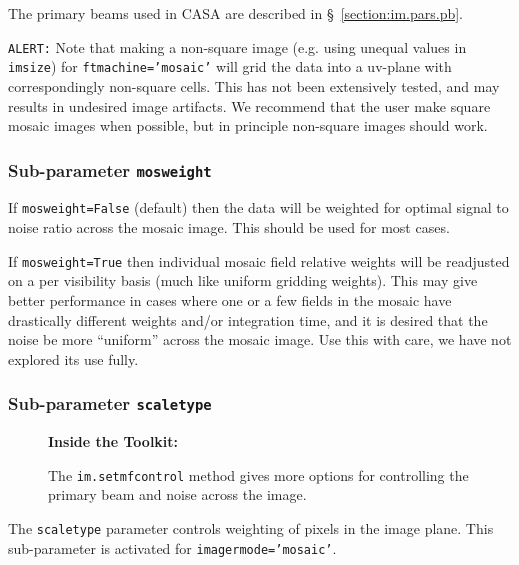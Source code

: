 The primary beams used in CASA are described in \S~\ref{section:im.pars.pb}.

{\tt ALERT:} Note that making a non-square image (e.g. using
unequal values in {\tt imsize}) for {\tt ftmachine='mosaic'} will grid 
the data into a uv-plane with correspondingly non-square cells.  This
has not been extensively tested, and may results in undesired image
artifacts.  We recommend that the user make square mosaic images when
possible, but in principle non-square images should work.

\subsubsection{Sub-parameter {\tt mosweight} }
\label{section:im.imagermode.mosaic.mosweight}

If {\tt mosweight=False} (default) then the data will be
weighted for optimal signal to noise ratio across the mosaic image. 
This should be used for most cases.

If {\tt mosweight=True} then individual mosaic field relative weights
will be readjusted on a per visibility basis (much like uniform
gridding weights).  This may give better performance in cases where
one or a few fields in the mosaic have drastically different weights
and/or integration time, and it is desired that the noise be more
``uniform'' across the mosaic image.  Use this with care, we have
not explored its use fully.

\subsubsection{Sub-parameter {\tt scaletype} }
\label{section:im.clean.imagermode.scaletype}

\begin{wrapfigure}{r}{2.5in}
  \begin{boxedminipage}{2.5in}
     \centerline{\bf Inside the Toolkit:}
     The {\tt im.setmfcontrol} method gives more options for
     controlling the primary beam and noise across the image.
  \end{boxedminipage}
\end{wrapfigure}

The {\tt scaletype} parameter controls weighting of pixels in the 
image plane.  This sub-parameter is activated for {\tt imagermode='mosaic'}.

